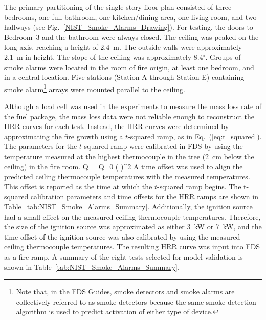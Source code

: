 The primary partitioning of the single-story floor plan consisted of three bedrooms, one full bathroom, one kitchen/dining area, one living room, and two hallways (see Fig.~\ref{NIST_Smoke_Alarms_Drawing}). For testing, the doors to Bedroom~3 and the bathroom were always closed. The ceiling was peaked on the long axis, reaching a height of 2.4~m. The outside walls were approximately 2.1~m in height. The slope of the ceiling was approximately 8.4$^\circ$. Groups of smoke alarms were located in the room of fire origin, at least one bedroom, and in a central location. Five stations (Station A through Station E) containing smoke alarm\footnote{Note that, in the FDS Guides, smoke detectors and smoke alarms are collectively referred to as smoke detectors because the same smoke detection algorithm is used to predict activation of either type of device.} arrays were mounted parallel to the ceiling.

Although a load cell was used in the experiments to measure the mass loss rate of the fuel package, the mass loss data were not reliable enough to reconstruct the HRR curves for each test. Instead, the HRR curves were determined by approximating the fire growth using a $t$-squared ramp, as in Eq.~(\ref{eq:t_squared}). The parameters for the $t$-squared ramp were calibrated in FDS by using the temperature measured at the highest thermocouple in the tree (2~cm below the ceiling) in the fire room.
\be
\dot Q = \dot Q_0 \left(  \right)^2
\label{eq:t_squared}
\ee
A time offset was used to align the predicted ceiling thermocouple temperatures with the measured temperatures. This offset is reported as the time at which the $t$-squared ramp begins. The t-squared calibration parameters and time offsets for the HRR ramps are shown in Table~\ref{tab:NIST_Smoke_Alarms_Summary}. Additionally, the ignition source had a small effect on the measured ceiling thermocouple temperatures. Therefore, the size of the ignition source was approximated as either 3~kW or 7~kW, and the time offset of the ignition source was also calibrated by using the measured ceiling thermocouple temperatures. The resulting HRR curve was input into FDS as a fire ramp. A summary of the eight tests selected for model validation is shown in Table~\ref{tab:NIST_Smoke_Alarms_Summary}.

